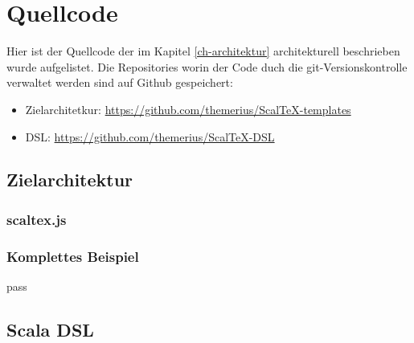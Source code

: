 \chapter{Quellcode}

Hier ist der Quellcode der im Kapitel \ref{ch-architektur} architekturell
beschrieben wurde aufgelistet.
Die Repositories worin der Code duch die git-Versionskontrolle
verwaltet werden sind auf Github gespeichert:

\begin{itemize}
  \item Zielarchitetkur: \url{https://github.com/themerius/ScalTeX-templates}
  \item DSL: \url{https://github.com/themerius/ScalTeX-DSL}
\end{itemize}

\section{Zielarchitektur}\label{appendix-zielarchitektur}

\subsection{scaltex.js}

%

\subsection{Komplettes Beispiel}\label{appendix-ziel_beispiel}

pass %


\section{Scala DSL}

